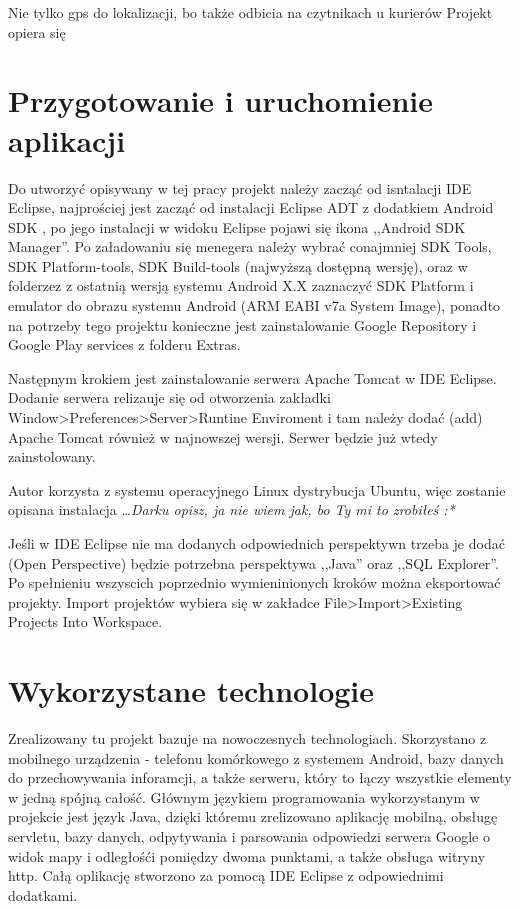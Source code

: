 \documentclass[eng,printmode,oneside]{mgr}
\begin{document}
 Nie tylko gps do lokalizacji, bo także odbicia
na czytnikach u kurierów Projekt opiera się 

\chapter{Przygotowanie i uruchomienie aplikacji}

Do utworzyć opisywany w tej pracy projekt należy zacząć od isntalacji IDE
Eclipse,  najprościej jest zacząć od instalacji Eclipse ADT z dodatkiem Android
SDK \cite{eclipse}, po jego instalacji w widoku Eclipse pojawi się ikona
,,Android SDK Manager''. Po załadowaniu się menegera należy wybrać conajmniej
SDK Tools, SDK Platform-tools, SDK Build-tools (najwyższą dostępną wersję), oraz w
folderzez z ostatnią wersją systemu Android X.X zaznaczyć SDK Platform i
emulator do obrazu systemu Android (ARM EABI v7a System Image), ponadto na
potrzeby tego projektu konieczne jest zainstalowanie Google Repository i Google
Play services z folderu Extras.

Następnym krokiem jest zainstalowanie serwera Apache Tomcat w IDE Eclipse.
Dodanie serwera relizauje się od otworzenia zakładki
Window>Preferences>Server>Runtine Enviroment i tam należy dodać (add) Apache
Tomcat również w najnowszej wersji. Serwer będzie już wtedy zainstolowany. 

Autor korzysta z systemu operacyjnego Linux dystrybucja Ubuntu, więc zostanie
opisana instalacja \emph{\color{komentarz}\ldots Darku opisz, ja nie wiem jak,
bo Ty mi to zrobiłeś :*}

Jeśli w IDE Eclipse nie ma dodanych odpowiednich perspektywn trzeba je dodać
(Open Perspective) będzie potrzebna perspektywa ,,Java'' oraz ,,SQL Explorer''.
Po spełnieniu wszyscich poprzednio wymieninionych kroków można eksportować
projekty. Import projektów wybiera się w zakładce File>Import>Existing Projects
Into Workspace.

\chapter{Wykorzystane technologie}

Zrealizowany tu projekt bazuje na nowoczesnych technologiach.
Skorzystano z mobilnego urządzenia - telefonu komórkowego z systemem
Android, bazy danych do przechowywania inforamcji, a także serweru, który to
łączy wszystkie elementy w jedną spójną całość. Głównym językiem
programowania wykorzystanym w projekcie jest język Java, dzięki któremu
zrelizowano aplikację mobilną, obsługę servletu, bazy danych, odpytywania i
parsowania odpowiedzi serwera Google o widok mapy i odległośći pomiędzy dwoma
punktami, a także obsługa witryny http. Całą oplikację stworzono za pomocą IDE
Eclipse z odpowiednimi dodatkami.
\end{document}
